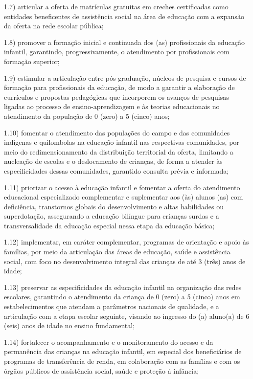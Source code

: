 \documentclass[
]{book}
\begin{document}
1.7) articular a oferta de matrículas gratuitas em creches certificadas como entidades beneficentes de assistência social na área de educação com a expansão da oferta na rede escolar pública;

1.8) promover a formação inicial e continuada dos (as) profissionais da educação infantil, garantindo, progressivamente, o atendimento por profissionais com formação superior;

1.9) estimular a articulação entre pós-graduação, núcleos de pesquisa e cursos de formação para profissionais da educação, de modo a garantir a elaboração de currículos e propostas pedagógicas que incorporem os avanços de pesquisas ligadas ao processo de ensino-aprendizagem e às teorias educacionais no atendimento da população de 0 (zero) a 5 (cinco) anos;

1.10) fomentar o atendimento das populações do campo e das comunidades indígenas e quilombolas na educação infantil nas respectivas comunidades, por meio do redimensionamento da distribuição territorial da oferta, limitando a nucleação de escolas e o deslocamento de crianças, de forma a atender às especificidades dessas comunidades, garantido consulta prévia e informada;

1.11) priorizar o acesso à educação infantil e fomentar a oferta do atendimento educacional especializado complementar e suplementar aos (às) alunos (as) com deficiência, transtornos globais do desenvolvimento e altas habilidades ou superdotação, assegurando a educação bilíngue para crianças surdas e a transversalidade da educação especial nessa etapa da educação básica;

1.12) implementar, em caráter complementar, programas de orientação e apoio às famílias, por meio da articulação das áreas de educação, saúde e assistência social, com foco no desenvolvimento integral das crianças de até 3 (três) anos de idade;

1.13) preservar as especificidades da educação infantil na organização das redes escolares, garantindo o atendimento da criança de 0 (zero) a 5 (cinco) anos em estabelecimentos que atendam a parâmetros nacionais de qualidade, e a articulação com a etapa escolar seguinte, visando ao ingresso do (a) aluno(a) de 6 (seis) anos de idade no ensino fundamental;

1.14) fortalecer o acompanhamento e o monitoramento do acesso e da permanência das crianças na educação infantil, em especial dos beneficiários de programas de transferência de renda, em colaboração com as famílias e com os órgãos públicos de assistência social, saúde e proteção à infância;
\end{document}
